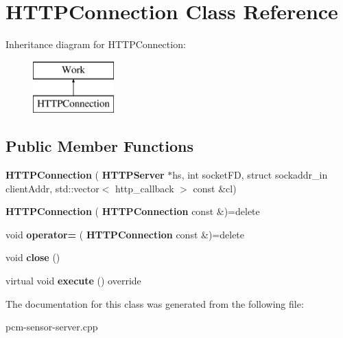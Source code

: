 \section{H\+T\+T\+P\+Connection Class Reference}
\label{classHTTPConnection}
Inheritance diagram for H\+T\+T\+P\+Connection\+:\begin{figure}[H]
\begin{center}
\leavevmode
\includegraphics[height=2.000000cm]{classHTTPConnection}
\end{center}
\end{figure}
\subsection*{Public Member Functions}
\begin{DoxyCompactItemize}
\item 
\mbox{\label{classHTTPConnection_aeb9133ab7a9e73c21c9c0e45b89669b7}} 
{\bfseries H\+T\+T\+P\+Connection} (\textbf{ H\+T\+T\+P\+Server} $\ast$hs, int socket\+FD, struct sockaddr\+\_\+in client\+Addr, std\+::vector$<$ http\+\_\+callback $>$ const \&cl)
\item 
\mbox{\label{classHTTPConnection_af65dc6ef443667be9db6580a19577bfb}} 
{\bfseries H\+T\+T\+P\+Connection} (\textbf{ H\+T\+T\+P\+Connection} const \&)=delete
\item 
\mbox{\label{classHTTPConnection_a8bc71198733271fbab9772c89f0a19b9}} 
void {\bfseries operator=} (\textbf{ H\+T\+T\+P\+Connection} const \&)=delete
\item 
\mbox{\label{classHTTPConnection_a225429e8f1b1dbddbaca0c2c2ade5ee4}} 
void {\bfseries close} ()
\item 
\mbox{\label{classHTTPConnection_a741318f6e05c71fbf654b6cb590b3d86}} 
virtual void {\bfseries execute} () override
\end{DoxyCompactItemize}


The documentation for this class was generated from the following file\+:\begin{DoxyCompactItemize}
\item 
pcm-\/sensor-\/server.\+cpp\end{DoxyCompactItemize}
